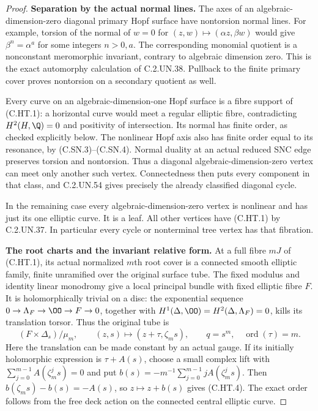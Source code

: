 \begin{proof}
\par\medskip\noindent\textbf{Separation by the actual normal lines.}
The axes of an algebraic-dimension-zero diagonal primary Hopf
surface have nontorsion normal lines. For example, torsion of the
normal of $w=0$ for $(z,w)\mapsto(\alpha z,\beta w)$ would give
$\beta^n=\alpha^a$ for some integers $n>0,a$. The corresponding
monomial quotient is a nonconstant meromorphic invariant, contrary
to algebraic dimension zero. This is the exact automorphy
calculation of C.2.UN.38. Pullback to the finite primary cover
proves nontorsion on a secondary quotient as well.

Every curve on an algebraic-dimension-one Hopf surface is a fibre
support of (C.HT.1): a horizontal curve would meet a regular elliptic
fibre, contradicting $H^2(H,\Q)=0$ and positivity of intersection.
Its normal has finite order, as checked explicitly below. The
nonlinear Hopf axis also has finite order equal to its resonance,
by (C.SN.3)--(C.SN.4). Normal duality at an actual reduced SNC edge
preserves torsion and nontorsion. Thus a diagonal
algebraic-dimension-zero vertex can meet only another such vertex.
Connectedness then puts every component in that class, and
C.2.UN.54 gives precisely the already classified diagonal cycle.

In the remaining case every algebraic-dimension-zero vertex is
nonlinear and has just its one elliptic curve. It is a leaf.
All other vertices have (C.HT.1) by C.2.UN.37. In particular every
cycle or nonterminal tree vertex has that fibration.

\par\medskip\noindent\textbf{The root charts and the invariant relative form.}
At a full fibre $mJ$ of (C.HT.1), its actual normalized $m$th root
cover is a connected smooth elliptic family, finite unramified over
the original surface tube. The fixed modulus and identity linear
monodromy give a local principal bundle with fixed elliptic fibre
$F$. It is holomorphically trivial on a disc: the exponential
sequence $0\to\Lambda_F\to\OO\to F\to0$, together with
$H^1(\Delta,\OO)=H^2(\Delta,\Lambda_F)=0$, kills its translation
torsor. Thus the original tube is
\[
       (F\times\Delta_s)/\mu_m,\qquad
       (z,s)\longmapsto(z+\tau,\zeta_m s),\qquad
       q=s^m,\quad \operatorname{ord}(\tau)=m.          \tag{C.HT.4}
\]
Here the translation can be made constant by an actual gauge.
If its initially holomorphic expression is $\tau+A(s)$, choose a
small complex lift with $\sum_{j=0}^{m-1}A(\zeta_m^j s)=0$ and put
$b(s)=-m^{-1}\sum_{j=0}^{m-1}jA(\zeta_m^j s)$.
Then $b(\zeta_ms)-b(s)=-A(s)$, so $z\mapsto z+b(s)$ gives (C.HT.4).
The exact order follows from the free deck action on the connected
central elliptic curve.


\end{proof}
